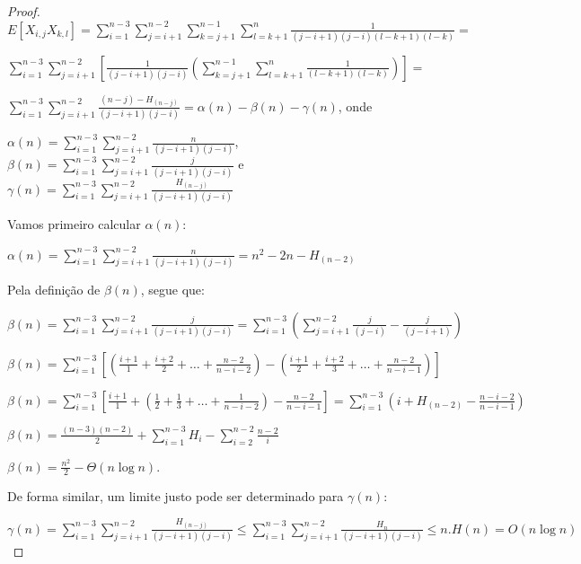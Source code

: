 \documentclass[dissertacao, brazil]{ThesisPUC}
\begin{document}
\begin{proof}
$E[X_{i,j} X_{k,l}] = \sum\limits_{i=1}^{n-3} \sum\limits_{j=i+1}^{n-2}
\sum\limits_{k=j+1}^{n-1} \sum\limits_{l=k+1}^{n} \frac{1}{(j-i+1)(j-i)(l-k+1)(l-k)} = $

$\sum\limits_{i=1}^{n-3} \sum\limits_{j=i+1}^{n-2}  \left[ \frac{1}{(j-i+1)(j-i)}
\left( \sum\limits_{k=j+1}^{n-1} \sum\limits_{l=k+1}^{n} \frac{1}{(l-k+1)(l-k)} \right) \right] =  $

$\sum\limits_{i=1}^{n-3} \sum\limits_{j=i+1}^{n-2} \frac{(n - j) - H_{(n - j)}} {(j-i+1)(j-i)} 
= \alpha(n) - \beta(n) - \gamma(n)$, onde

$\alpha(n) = \sum\limits_{i=1}^{n-3} \sum\limits_{j=i+1}^{n-2} \frac{n} {(j-i+1)(j-i)}$,
$\beta(n) = \sum\limits_{i=1}^{n-3} \sum\limits_{j=i+1}^{n-2} \frac{j} {(j-i+1)(j-i)}$ e 
$\gamma(n) =  \sum\limits_{i=1}^{n-3} \sum\limits_{j=i+1}^{n-2} \frac{H_{(n - j)}} {(j-i+1)(j-i)}$

Vamos primeiro calcular $\alpha(n)$:

$\alpha(n) = \sum\limits_{i=1}^{n-3} \sum\limits_{j=i+1}^{n-2} \frac{n} {(j-i+1)(j-i)}
= n^2 - 2n - H_{(n-2)}$

Pela definição de $\beta(n)$, segue que:

$\beta(n) = \sum\limits_{i=1}^{n-3} \sum\limits_{j=i+1}^{n-2} \frac{j} {(j-i+1)(j-i)}
= \sum\limits_{i=1}^{n-3} \left( \sum\limits_{j=i+1}^{n-2} \frac{j}{(j-i)} - \frac{j} {(j-i+1)} \right)$

$\beta(n) = \sum\limits_{i=1}^{n-3} \left[ \left( \frac{i+1}{1} +  \frac{i+2}{2} + \ldots + \frac{n-2}{n-i-2} \right)
- \left( \frac{i+1}{2} +  \frac{i+2}{3} + \ldots + \frac{n-2}{n-i-1} \right) \right]$

$\beta(n) = \sum\limits_{i=1}^{n-3} \left[
\frac{i+1}{1}  + \left( \frac{1}{2} +  \frac{1}{3} + \ldots + \frac{1}{n-i-2} \right)
- \frac{n-2}{n-i-1} \right]
= \sum\limits_{i=1}^{n-3} \left( i + H_{(n-2)} - \frac{n-i-2}{n-i-1} \right)$

$\beta(n) = \frac{(n-3)(n-2)}{2} + \sum\limits_{i=1}^{n-3} H_{i} - \sum\limits_{i=2}^{n-2} \frac{n-2}{i}$

$\beta(n) = \frac{n^2}{2} - \Theta(n \log n)$.

De forma similar, um limite justo pode ser determinado para $\gamma(n)$:

$\gamma(n) =  \sum\limits_{i=1}^{n-3} \sum\limits_{j=i+1}^{n-2} \frac{H_{(n - j)}} {(j-i+1)(j-i)}
\leq  \sum\limits_{i=1}^{n-3} \sum\limits_{j=i+1}^{n-2} \frac{H_{n}} {(j-i+1)(j-i)}
\leq  n . H(n) = O(n \log n) $


\end{proof}
\end{document}
